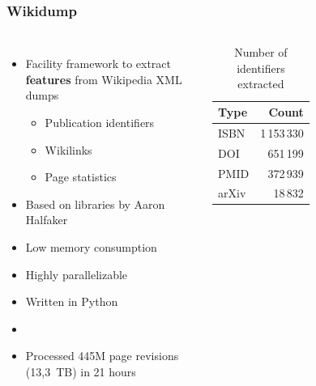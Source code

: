 \documentclass{beamer}
\begin{document}
\begin{frame}
    \frametitle{Wikidump}
    \begin{columns}[t]
        \begin{itemize}
            \item Facility framework to extract \textbf{features} from Wikipedia XML dumps
            \begin{itemize}
                \item Publication identifiers
                \item Wikilinks
                \item Page statistics
            \end{itemize}
            \item Based on libraries by Aaron Halfaker
            \item Low memory consumption
            \item Highly parallelizable
            \item Written in Python
            \item[]
            \item Processed 445M page revisions (13,3~TB) in 21 hours
        \end{itemize}
        \begin{table}
        \begin{tabular}{l r}
        \toprule
        \textbf{Type} & \textbf{Count} \\ %
        \midrule
        ISBN    & 1\,153\,330     \\ %
        DOI     & 651\,199        \\ %
        PMID    & 372\,939        \\ %
        arXiv   & 18\,832         \\ %
        \bottomrule
        \end{tabular}
        \caption{\centering Number of identifiers extracted}
        \end{table}
    \end{columns}
\end{frame}
\end{document}
